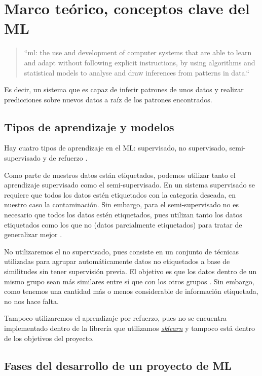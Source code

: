\section{Marco teórico, conceptos clave del ML}

\begin{quote}
    ``\gls{ml}: the use and development of computer systems that are able to learn and adapt without following explicit instructions, by using algorithms and statistical models to analyse and draw inferences from patterns in data.`` \cite{machinel18:online}
\end{quote}

Es decir, un sistema que es capaz de inferir patrones de unos datos y realizar predicciones sobre nuevos datos a raíz de los patrones encontrados. 


\subsection{Tipos de aprendizaje y modelos}

Hay cuatro tipos de aprendizaje en el ML: supervisado, no supervisado, semi-supervisado y de refuerzo \cite{homl56}.

Como parte de nuestros datos están etiquetados, podemos utilizar tanto el aprendizaje supervisado como el semi-supervisado. En un sistema supervisado se requiere que todos los datos estén etiquetados con la categoría deseada, en nuestro caso la contaminación. Sin embargo, para el semi-supervisado no es necesario que todos los datos estén etiquetados, pues utilizan tanto los datos etiquetados como los que no (datos parcialmente etiquetados) para tratar de generalizar mejor \cite{homl56}.

No utilizaremos el no supervisado, pues consiste en un conjunto de técnicas utilizadas para agrupar automáticamente datos no etiquetados a base de similitudes sin tener supervisión previa. El objetivo es que los datos dentro de un mismo grupo sean más similares entre sí que con los otros grupos \cite{Clustera13:online}. Sin embargo, como tenemos una cantidad más o menos considerable de información etiquetada, no nos hace falta.

Tampoco utilizaremos el aprendizaje por refuerzo, pues no se encuentra implementado dentro de la librería que utilizamos \textit{\href{https://scikit-learn.org/stable/}{sklearn}} y tampoco está dentro de los objetivos del proyecto.


\subsection{Fases del desarrollo de un proyecto de ML}

